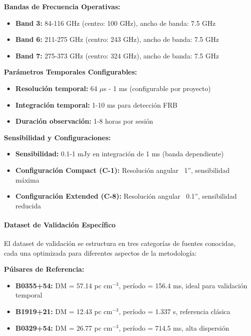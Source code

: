 \textbf{Bandas de Frecuencia Operativas:}
\begin{itemize}
\item \textbf{Band 3:} 84-116 GHz (centro: 100 GHz), ancho de banda: 7.5 GHz
\item \textbf{Band 6:} 211-275 GHz (centro: 243 GHz), ancho de banda: 7.5 GHz  
\item \textbf{Band 7:} 275-373 GHz (centro: 324 GHz), ancho de banda: 7.5 GHz
\end{itemize}

\textbf{Parámetros Temporales Configurables:}
\begin{itemize}
\item \textbf{Resolución temporal:} 64 $\mu$s - 1 ms (configurable por proyecto)
\item \textbf{Integración temporal:} 1-10 ms para detección FRB
\item \textbf{Duración observación:} 1-8 horas por sesión
\end{itemize}

\textbf{Sensibilidad y Configuraciones:}
\begin{itemize}
\item \textbf{Sensibilidad:} 0.1-1 mJy en integración de 1 ms (banda dependiente)
\item \textbf{Configuración Compact (C-1):} Resolución angular ~1'', sensibilidad máxima
\item \textbf{Configuración Extended (C-8):} Resolución angular ~0.1'', sensibilidad reducida
\end{itemize}

\paragraph{Dataset de Validación Específico}

El dataset de validación se estructura en tres categorías de fuentes conocidas, cada una optimizada para diferentes aspectos de la metodología:

\textbf{Púlsares de Referencia:}
\begin{itemize}
\item \textbf{B0355+54:} DM = 57.14 pc cm$^{-3}$, período = 156.4 ms, ideal para validación temporal
\item \textbf{B1919+21:} DM = 12.43 pc cm$^{-3}$, período = 1.337 s, referencia clásica
\item \textbf{B0329+54:} DM = 26.77 pc cm$^{-3}$, período = 714.5 ms, alta dispersión
\end{itemize}

